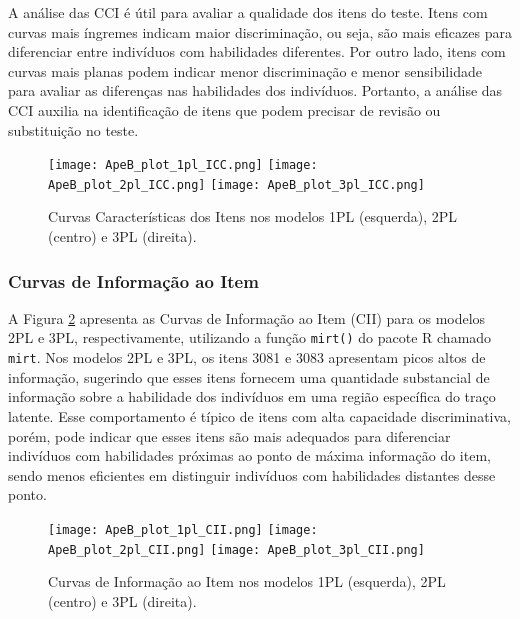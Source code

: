A análise das CCI é útil para avaliar a qualidade dos itens do teste. Itens com curvas mais íngremes indicam maior discriminação, ou seja, são mais eficazes para diferenciar entre indivíduos com habilidades diferentes. Por outro lado, itens com curvas mais planas podem indicar menor discriminação e menor sensibilidade para avaliar as diferenças nas habilidades dos indivíduos. Portanto, a análise das CCI auxilia na identificação de itens que podem precisar de revisão ou substituição no teste.

\begin{figure}[!ht]
    \centering
    \texttt{[image: ApeB\_plot\_1pl\_ICC.png]}
    \texttt{[image: ApeB\_plot\_2pl\_ICC.png]}
    \texttt{[image: ApeB\_plot\_3pl\_ICC.png]}
    \caption{Curvas Características dos Itens nos modelos 1PL (esquerda), 2PL (centro) e 3PL (direita).}
    \label{fig:ApeB_plot_ALL_ICC}
    \end{figure}


\subsubsection{Curvas de Informação ao Item}\label{sec:apeB_cci}

A Figura \ref{fig:ApeB_plot_CII} apresenta as Curvas de Informação ao Item (CII) para os modelos 2PL e 3PL, respectivamente, utilizando a função \verb|mirt()| do pacote R chamado \verb|mirt|. Nos modelos 2PL e 3PL, os itens 3081 e 3083  apresentam picos altos de informação, sugerindo que esses itens fornecem uma quantidade substancial de informação sobre a habilidade dos indivíduos em uma região específica do traço latente. Esse comportamento é típico de itens com alta capacidade discriminativa, porém, pode indicar que esses itens são mais adequados para diferenciar indivíduos com habilidades próximas ao ponto de máxima informação do item, sendo menos eficientes em distinguir indivíduos com habilidades distantes desse ponto.

\begin{figure}[!ht]
\centering
\texttt{[image: ApeB\_plot\_1pl\_CII.png]}
\texttt{[image: ApeB\_plot\_2pl\_CII.png]}
\texttt{[image: ApeB\_plot\_3pl\_CII.png]}
\caption{Curvas de Informação ao Item nos modelos 1PL (esquerda), 2PL (centro) e 3PL (direita).}
\label{fig:ApeB_plot_CII}
\end{figure}

